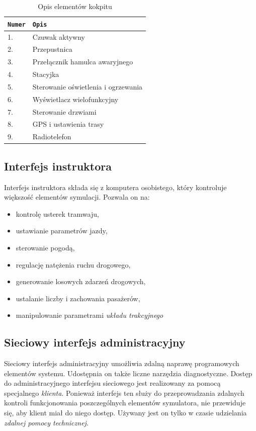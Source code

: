 \documentclass[12pt,a4paper]{article}
\begin{document}
\begin{table}[p!]
\caption{Opis elementów kokpitu}
	\begin{center}
\begin{tabular}{l|l}
\texttt{Numer} & \texttt{Opis} \\ \hline
1.&Czuwak aktywny\\
2.&Przepustnica\\
3.&Przełącznik hamulca awaryjnego\\
4.&Stacyjka\\
5.&Sterowanie oświetlenia i ogrzewania\\
6.&Wyświetlacz wielofunkcyjny\\
7.&Sterowanie drzwiami\\
8.&GPS i ustawienia trasy\\
9.&Radiotelefon\\
\end{tabular}
\label{opis}
\end{center}
\end{table}
\subsection{Interfejs instruktora}
Interfejs instruktora składa się z komputera osobistego, który kontroluje większość elementów symulacji. 
Pozwala on na:
\begin{itemize}
\item kontrolę usterek tramwaju,
\item ustawianie parametrów jazdy,
\item sterowanie pogodą,
\item regulację natężenia ruchu drogowego,
\item generowanie losowych zdarzeń drogowych,
\item ustalanie liczby i zachowania pasażerów,
\item manipulowanie parametrami {\it układu trakcyjnego}
\end{itemize}
\subsection{Sieciowy interfejs administracyjny}
Sieciowy interfejs administracyjny umożliwia zdalną naprawę programowych elementów systemu. Udostępnia on także
liczne narzędzia diagnostyczne. Dostęp do administracyjnego interfejsu sieciowego jest realizowany za pomocą specjalnego {\it klienta}.
Ponieważ interfejs ten służy do przeprowadzania zdalnych kontroli funkcjonowania poszczególnych elementów symulatora, nie przewiduje się, 
aby klient miał do niego dostęp. Używany jest on tylko w czasie udzielania {\it zdalnej pomocy technicznej}.
\end{document}
